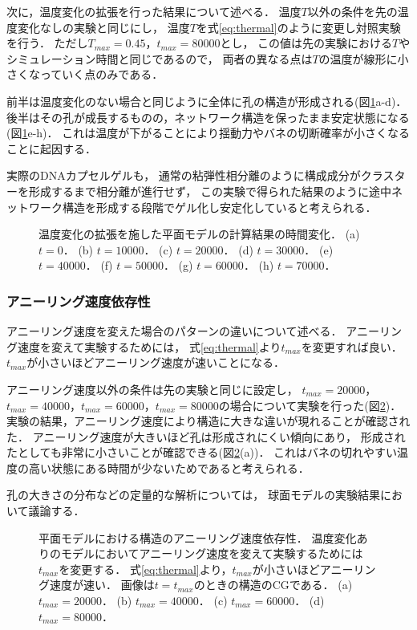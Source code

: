 次に，温度変化の拡張を行った結果について述べる．
温度$T$以外の条件を先の温度変化なしの実験と同じにし，
温度$T$を式\ref{eq:thermal}のように変更し対照実験を行う．
ただし$T_{max}=0.45$，$t_{max}=80000$とし，
この値は先の実験における$T$やシミュレーション時間と同じであるので，
両者の異なる点は$T$の温度が線形に小さくなっていく点のみである．

前半は温度変化のない場合と同じように全体に孔の構造が形成される(図\ref{fig:result_2d_with_anearing}a-d)．
後半はその孔が成長するものの，ネットワーク構造を保ったまま安定状態になる(図\ref{fig:result_2d_with_anearing}e-h)．
これは温度が下がることにより揺動力やバネの切断確率が小さくなることに起因する．

実際のDNAカプセルゲルも，
通常の粘弾性相分離のように構成成分がクラスターを形成するまで相分離が進行せず，
この実験で得られた結果のように途中ネットワーク構造を形成する段階でゲル化し安定化していると考えられる．

\begin{figure}
\centering

\caption{
    温度変化の拡張を施した平面モデルの計算結果の時間変化．
    (a) $t=0$．
    (b) $t=10000$．
    (c) $t=20000$．
    (d) $t=30000$．
    (e) $t=40000$．
    (f) $t=50000$．
    (g) $t=60000$．
    (h) $t=70000$．
}
\label{fig:result_2d_with_anearing}
\end{figure}

\subsubsection{アニーリング速度依存性}
アニーリング速度を変えた場合のパターンの違いについて述べる．
アニーリング速度を変えて実験するためには，
式\ref{eq:thermal}より$t_{max}$を変更すれば良い．
$t_{max}$が小さいほどアニーリング速度が速いことになる．

アニーリング速度以外の条件は先の実験と同じに設定し，
$t_{max}=20000$，$t_{max}=40000$，$t_{max}=60000$，$t_{max}=80000$の場合について実験を行った(図\ref{fig:result_2d_anearing_speed})．
実験の結果，アニーリング速度により構造に大きな違いが現れることが確認された．
アニーリング速度が大きいほど孔は形成されにくい傾向にあり，
形成されたとしても非常に小さいことが確認できる(図\ref{fig:result_2d_anearing_speed}(a))．
これはバネの切れやすい温度の高い状態にある時間が少ないためであると考えられる．

孔の大きさの分布などの定量的な解析については，
球面モデルの実験結果において議論する．

\begin{figure}
\centering

\caption{
    平面モデルにおける構造のアニーリング速度依存性．
    温度変化ありのモデルにおいてアニーリング速度を変えて実験するためには$t_{max}$を変更する．
    式\ref{eq:thermal}より，$t_{max}$が小さいほどアニーリング速度が速い．
    画像は$t=t_{max}$のときの構造のCGである．
    (a) $t_{max}=20000$．
    (b) $t_{max}=40000$．
    (c) $t_{max}=60000$．
    (d) $t_{max}=80000$．
}
\label{fig:result_2d_anearing_speed}
\end{figure}



